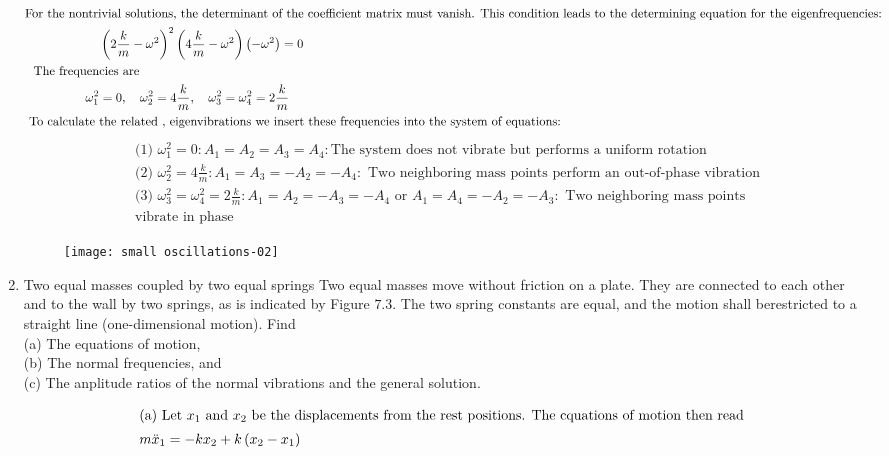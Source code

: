 \begin{enumerate}
\begin{answer}
\begin{align*}
	\intertext{For the nontrivial solutions, the determinant of the coefficient matrix must vanish. This condition leads to the determining equation for the eigenfrequencies:}
	&\left(2 \frac{k}{m}-\omega^{2}\right)^{2}\left(4 \frac{k}{m}-\omega^{2}\right)\left(-\omega^{2}\right)=0\\
	\text{The frequen}&\text{cies are}\\
	\omega_{1}^{2}&=0, \quad \omega_{2}^{2}=4 \frac{k}{m}, \quad \omega_{3}^{2}=\omega_{4}^{2}=2 \frac{k}{m}\\
\text{	To calculate }&\text{the related , eigenvibrations we insert these frequencies into the system of equations:}
	\end{align*}
\begin{align*}
	&\text{(1) }\omega_{1}^{2}=0: A_{1}=A_{2}=A_{3}=A_{4} : \text{The system does not vibrate but performs a uniform rotation}\\
	&\text{(2) }\omega_{2}^{2}=4 \frac{k}{m}: A_{1}=A_{3}=-A_{2}=-A_{4}:\text{ Two neighboring mass points perform an out-of-phase vibration}\\
	&\text{(3) }\omega_{3}^{2}=\omega_{4}^{2}=2 \frac{k}{m}: A_{1}=A_{2}=-A_{3}=-A_{4}\text{ or }A_{1}=A_{4}=-A_{2}=-A_{3} :\text{ Two neighboring mass points }\\&\text{vibrate in phase}
	\end{align*}
	\begin{figure}[H]
		\centering
		\texttt{[image: small oscillations-02]}
	\end{figure}
	\end{answer}
	\item Two equal masses coupled by two equal springs
	Two equal masses move without friction on a plate. They are connected to each other and to the wall by two springs, as is indicated by Figure $7.3$. The two spring constants are equal, and the motion shall berestricted to a straight line (one-dimensional motion).
	Find\\
	(a) The equations of motion,\\
	(b) The normal frequencies, and\\
	(c) The anplitude ratios of the normal vibrations and the general solution.
	\begin{answer}
		\begin{align*}
		\intertext{(a) Let $x_{1}$ and $x_{2}$ be the displacements from the rest positions. The cquations of motion then read}
		m \ddot{x}_{1}&=-k x_{2}+k\left(x_{2}-x_{1}\right) \\

\end{align*}
\end{answer}
\end{enumerate}
